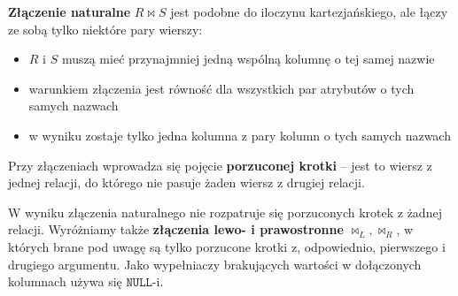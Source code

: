 \textbf{Złączenie naturalne} $R \bowtie S$ jest podobne do iloczynu kartezjańskiego, ale łączy ze sobą tylko niektóre pary wierszy:
\begin{itemize}
    \item $R$ i $S$ muszą mieć przynajmniej jedną wspólną kolumnę o tej samej nazwie
    \item warunkiem złączenia jest równość dla wszystkich par atrybutów o tych samych nazwach
    \item w wyniku zostaje tylko jedna kolumna z pary kolumn o tych samych nazwach
\end{itemize}

Przy złączeniach wprowadza się pojęcie \textbf{porzuconej krotki} -- jest to wiersz z jednej relacji, do którego nie pasuje żaden wiersz z drugiej relacji.

W wyniku złączenia naturalnego nie rozpatruje się porzuconych krotek z żadnej relacji. Wyróżniamy także \textbf{złączenia lewo- i prawostronne} $\bowtie_L, \bowtie_R$, w których brane pod uwagę są tylko porzucone krotki z, odpowiednio, pierwszego i drugiego argumentu. Jako wypełniaczy brakujących wartości w dołączonych kolumnach używa się $\texttt{NULL}$-i.

